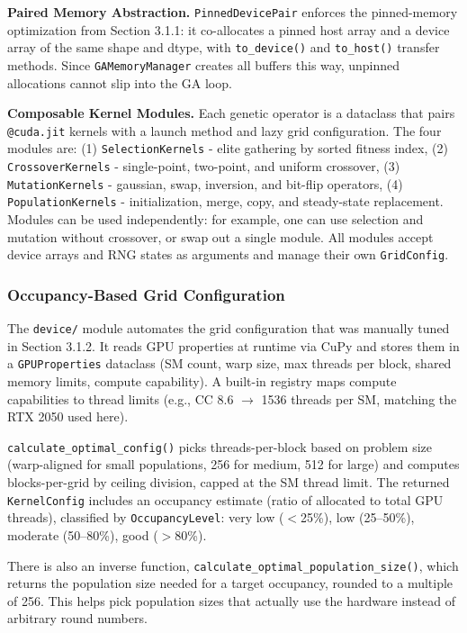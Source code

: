 \documentclass[a4paper,14pt]{extarticle}
\begin{document}
\textbf{Paired Memory Abstraction.}
\texttt{PinnedDevicePair} enforces the pinned-memory optimization from Section 3.1.1: it co-allocates a pinned host array and a device array of the same shape and dtype, with \texttt{to\_device()} and \texttt{to\_host()} transfer methods. Since \texttt{GAMemoryManager} creates all buffers this way, unpinned allocations cannot slip into the GA loop.

\textbf{Composable Kernel Modules.}
Each genetic operator is a dataclass that pairs \texttt{@cuda.jit} kernels with a launch method and lazy grid configuration. The four modules are:
(1) \texttt{Selection\-Kernels} - elite gathering by sorted fitness index,
(2) \texttt{Crossover\-Kernels} - single-point, two-point, and uniform crossover,
(3) \texttt{Mutation\-Kernels} - gaussian, swap, inversion, and bit-flip operators,
(4) \texttt{Population\-Kernels} - initialization, merge, copy, and steady-state replacement.
Modules can be used independently: for example, one can use selection and mutation without crossover, or swap out a single module. All modules accept device arrays and RNG states as arguments and manage their own \texttt{GridConfig}.

\subsubsection*{Occupancy-Based Grid Configuration}

The \texttt{device/} module automates the grid configuration that was manually tuned in Section 3.1.2. It reads GPU properties at runtime via CuPy and stores them in a \texttt{GPUProperties} dataclass (SM count, warp size, max threads per block, shared memory limits, compute capability). A built-in registry maps compute capabilities to thread limits (e.g., CC 8.6 $\to$ 1536 threads per SM, matching the RTX 2050 used here).

\texttt{calculate\_optimal\_config()} picks threads-per-block based on problem size (warp-aligned for small populations, 256 for medium, 512 for large) and computes blocks-per-grid by ceiling division, capped at the SM thread limit. The returned \texttt{KernelConfig} includes an occupancy estimate (ratio of allocated to total GPU threads), classified by \texttt{OccupancyLevel}: very low ($<$25\%), low (25--50\%), moderate (50--80\%), good ($>$80\%).

There is also an inverse function, \texttt{calculate\_optimal\_\allowbreak{}population\_size()}, which returns the population size needed for a target occupancy, rounded to a multiple of 256. This helps pick population sizes that actually use the hardware instead of arbitrary round numbers.
\end{document}
